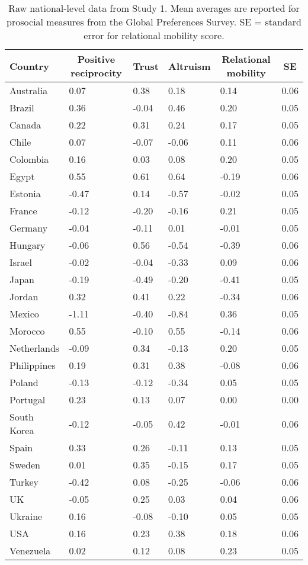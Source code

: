 \documentclass[
  man,floatsintext]{apa6}
\begin{document}
\begin{table}[h]

\begin{center}
\begin{threeparttable}

\caption{\label{tab:tableRaw1}Raw national-level data from Study 1. Mean averages are reported for prosocial measures from the Global Preferences Survey. SE = standard error for relational mobility score.}

\begin{tabular}{llllll}
\toprule
Country & \multicolumn{1}{c}{Positive reciprocity} & \multicolumn{1}{c}{Trust} & \multicolumn{1}{c}{Altruism} & \multicolumn{1}{c}{Relational mobility} & \multicolumn{1}{c}{SE}\\
\midrule
Australia & 0.07 & 0.38 & 0.18 & 0.14 & 0.06\\
Brazil & 0.36 & -0.04 & 0.46 & 0.20 & 0.05\\
Canada & 0.22 & 0.31 & 0.24 & 0.17 & 0.05\\
Chile & 0.07 & -0.07 & -0.06 & 0.11 & 0.06\\
Colombia & 0.16 & 0.03 & 0.08 & 0.20 & 0.05\\
Egypt & 0.55 & 0.61 & 0.64 & -0.19 & 0.06\\
Estonia & -0.47 & 0.14 & -0.57 & -0.02 & 0.05\\
France & -0.12 & -0.20 & -0.16 & 0.21 & 0.05\\
Germany & -0.04 & -0.11 & 0.01 & -0.01 & 0.05\\
Hungary & -0.06 & 0.56 & -0.54 & -0.39 & 0.06\\
Israel & -0.02 & -0.04 & -0.33 & 0.09 & 0.06\\
Japan & -0.19 & -0.49 & -0.20 & -0.41 & 0.05\\
Jordan & 0.32 & 0.41 & 0.22 & -0.34 & 0.06\\
Mexico & -1.11 & -0.40 & -0.84 & 0.36 & 0.05\\
Morocco & 0.55 & -0.10 & 0.55 & -0.14 & 0.06\\
Netherlands & -0.09 & 0.34 & -0.13 & 0.20 & 0.05\\
Philippines & 0.19 & 0.31 & 0.38 & -0.08 & 0.06\\
Poland & -0.13 & -0.12 & -0.34 & 0.05 & 0.05\\
Portugal & 0.23 & 0.13 & 0.07 & 0.00 & 0.00\\
South Korea & -0.12 & -0.05 & 0.42 & -0.01 & 0.06\\
Spain & 0.33 & 0.26 & -0.11 & 0.13 & 0.05\\
Sweden & 0.01 & 0.35 & -0.15 & 0.17 & 0.05\\
Turkey & -0.42 & 0.08 & -0.25 & -0.06 & 0.06\\
UK & -0.05 & 0.25 & 0.03 & 0.04 & 0.06\\
Ukraine & 0.16 & -0.08 & -0.10 & 0.05 & 0.05\\
USA & 0.16 & 0.23 & 0.38 & 0.18 & 0.06\\
Venezuela & 0.02 & 0.12 & 0.08 & 0.23 & 0.05\\
\bottomrule
\end{tabular}


\end{threeparttable}
\end{center}
\end{table}
\end{document}

